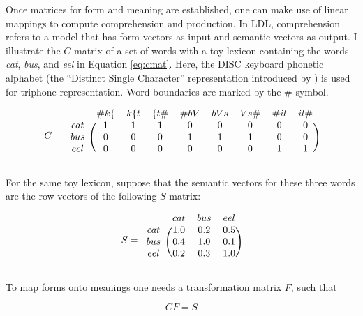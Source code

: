 Once matrices for form and meaning are established, one can make use of linear mappings to compute comprehension and production. In LDL, comprehension refers to a model that has form vectors as input and semantic vectors as output. I illustrate the $C$ matrix of a set of words with a toy lexicon containing the words \textit{cat}, \textit{bus}, and \textit{eel} in Equation \ref{eq:cmat}. Here, the DISC keyboard phonetic alphabet (the “Distinct Single Character” representation introduced by \cite{Burnage1988}) is used for triphone representation. Word boundaries are marked by the \# symbol.

\begin{equation}
\label{eq:cmat}
  C = 
    \begin{blockarray}{ccccccccc}
        & {\#k\{} & {k\{t} & {\{t\#} & {\#bV} & {bVs} & {Vs\#} & {\#il} & {il\#} \\
      \begin{block}{c(cccccccc)}
        cat & 1 & 1 & 1 & 0 & 0 & 0 & 0 & 0 \\
        bus & 0 & 0 & 0 & 1 & 1 & 1 & 0 & 0 \\
        eel & 0 & 0 & 0 & 0 & 0 & 0 & 1 & 1 \\
      \end{block}
    \end{blockarray}
\end{equation}

For the same toy lexicon, suppose that the semantic vectors for these three words are the row vectors of the following $S$ matrix:


\begin{equation}
\label{eq:smat}
  S = 
    \begin{blockarray}{cccc}
        & cat & bus & eel \\
      \begin{block}{c(ccc)}
        cat & 1.0 & 0.2 & 0.5 \\
        bus & 0.4 & 1.0 & 0.1 \\
        eel & 0.2 & 0.3 & 1.0 \\
      \end{block}
    \end{blockarray}
\end{equation}

To map forms onto meanings one needs a transformation matrix $F$, such that 

\begin{equation}
\label{eq:CFS}
    CF=S
\end{equation}

